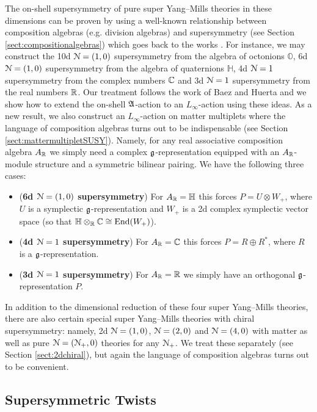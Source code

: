 \documentclass[10pt, oneside]{article}
\begin{document}
The on-shell supersymmetry of pure super Yang--Mills theories in these dimensions can be proven by using a well-known relationship between composition algebras (e.g. division algebras) and supersymmetry (see Section \ref{sect:compositionalgebras}) which goes back to the works \cite{Evans,KugoTownsend}. For instance, we may construct the 10d $\mathcal N=(1, 0)$ supersymmetry from the algebra of octonions $\mathbb{O}$, 6d $\mathcal N=(1, 0)$ supersymmetry from the algebra of quaternions $\mathbb{H}$, 4d $\mathcal N=1$ supersymmetry from the complex numbers $\mathbb C$ and 3d $\mathcal N=1$ supersymmetry from the real numbers $\mathbb R$. Our treatment follows the work of Baez and Huerta \cite{BaezHuerta} and we show how to extend the on-shell $\mathfrak A$-action to an $L_\infty$-action using these ideas. As a new result, we also construct an $L_\infty$-action on matter multiplets where the language of composition algebras turns out to be indispensable (see Section \ref{sect:mattermultipletSUSY}). Namely, for any real associative composition algebra $A_\mathbb R$ we simply need a complex $\mathfrak g$-representation equipped with an $A_\mathbb R$-module structure and a symmetric bilinear pairing. We have the following three cases:
\begin{itemize}
\item (\textbf{6d $\mathcal N=(1, 0)$ supersymmetry}) For $A_\mathbb R=\mathbb{H}$ this forces $P=U\otimes W_+$, where $U$ is a symplectic $\mathfrak g$-representation and $W_+$ is a 2d complex symplectic vector space (so that $\mathbb{H}\otimes_\mathbb R\mathbb C\cong \operatorname{End}(W_+)$).
\item (\textbf{4d $\mathcal N=1$ supersymmetry}) For $A_\mathbb R=\mathbb{C}$ this forces $P=R\oplus R^*$, where $R$ is a $\mathfrak g$-representation.
\item (\textbf{3d $\mathcal N=1$ supersymmetry}) For $A_\mathbb R=\mathbb{R}$ we simply have an orthogonal $\mathfrak g$-representation $P$.
\end{itemize}

In addition to the dimensional reduction of these four super Yang--Mills theories, there are also certain special super Yang--Mills theories with chiral supersymmetry: namely, 2d $\mathcal N=(1, 0)$, $\mathcal N=(2, 0)$ and $\mathcal N=(4, 0)$ with matter as well as pure $\mathcal N=(\mathcal N_+, 0)$ theories for any $\mathcal N_+$. We treat these separately (see Section \ref{sect:2dchiral}), but again the language of composition algebras turns out to be convenient.

\subsection*{Supersymmetric Twists}
\end{document}
